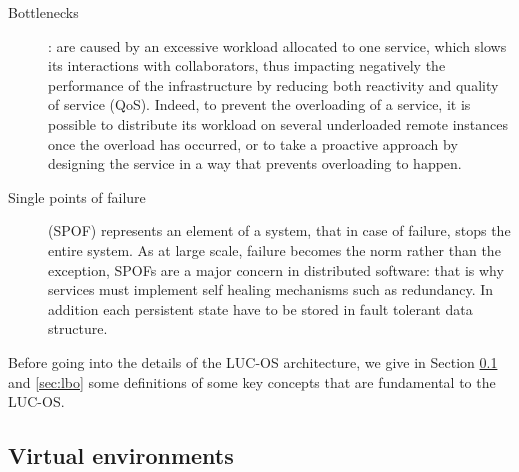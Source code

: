 \begin{description}

  \item [Bottlenecks] : are caused by an excessive workload allocated to one 
  service, which slows its interactions with collaborators, thus impacting
  negatively the performance of the infrastructure by reducing both reactivity 
  and quality of service (QoS). Indeed, to prevent the overloading of a service,
  it is possible to distribute its workload on several underloaded remote 
  instances once the overload has occurred, or to take a proactive approach by 
  designing the service in a way that prevents overloading to happen.

  \item [Single points of failure] (SPOF) represents an element of a system, 
  that in case of failure, stops the entire system. As at large scale, failure 
  becomes the norm rather than the exception, SPOFs are a major concern in
  distributed software: that is why services must implement self healing 
  mechanisms such as redundancy. In addition each persistent state have to be 
  stored in fault tolerant data structure.

\end{description}

Before going into the details of the LUC-OS architecture, we give in Section
\ref{sec:ve} and \ref{sec:lbo} some definitions of some key concepts that are 
fundamental to the LUC-OS.

\subsection{Virtual environments}
\label{sec:ve}

